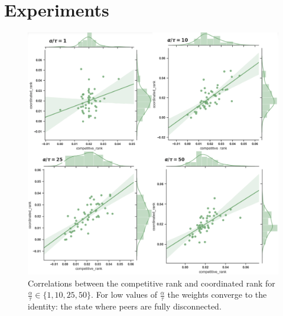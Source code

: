 \documentclass{article}
\begin{document}
\section{Experiments}
\label{experiments}
\begin{figure}[!htb]
	\centering
	\includegraphics[scale=.34]{images/c_vs_c_nice.png}
	\caption{Correlations between the competitive rank and coordinated rank for $\frac{\alpha}{\tau} \in \{1, 10, 25, 50\}$. For low values of $\frac{\alpha}{\tau}$ the weights converge to the identity: the state where peers are fully disconnected. }
	\label{coordvscomp}
\end{figure}
\smallskip
\end{document}
